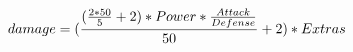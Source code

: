 \documentclass[preview]{standalone}
\begin{document}
\begin{align*}
\special{dvisvgm:raw <g id='unique000'>}damage = (\frac{(\frac{2 * 50}{5} + 2) * Power * \frac{Attack}{Defense}}{50} + 2) * Extras\special{dvisvgm:raw </g>}
\end{align*}
\end{document}
